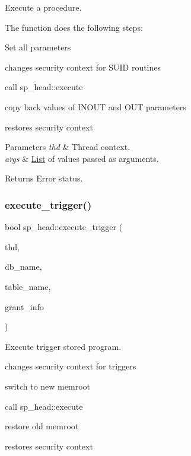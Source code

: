 Execute a procedure.

The function does the following steps\+:
\begin{DoxyItemize}
\item Set all parameters
\item changes security context for S\+U\+ID routines
\item call sp\+\_\+head\+::execute
\item copy back values of I\+N\+O\+UT and O\+UT parameters
\item restores security context
\end{DoxyItemize}


\begin{DoxyParams}{Parameters}
{\em thd} & Thread context. \\
\hline
{\em args} & \mbox{\hyperlink{classList}{List}} of values passed as arguments.\\
\hline
\end{DoxyParams}
\begin{DoxyReturn}{Returns}
Error status. 
\end{DoxyReturn}
\mbox{\label{classsp__head_abd450e9d13f6a39c7b7477ba4b12092f}} 
\subsubsection{\texorpdfstring{execute\+\_\+trigger()}{execute\_trigger()}}
{\footnotesize\ttfamily bool sp\+\_\+head\+::execute\+\_\+trigger (\begin{DoxyParamCaption}\item[{T\+HD $\ast$}]{thd,  }\item[{const L\+E\+X\+\_\+\+C\+S\+T\+R\+I\+NG \&}]{db\+\_\+name,  }\item[{const L\+E\+X\+\_\+\+C\+S\+T\+R\+I\+NG \&}]{table\+\_\+name,  }\item[{\mbox{\hyperlink{structGRANT__INFO}{G\+R\+A\+N\+T\+\_\+\+I\+N\+FO}} $\ast$}]{grant\+\_\+info }\end{DoxyParamCaption})}

Execute trigger stored program.


\begin{DoxyItemize}
\item changes security context for triggers
\item switch to new memroot
\item call sp\+\_\+head\+::execute
\item restore old memroot
\item restores security context
\end{DoxyItemize}


